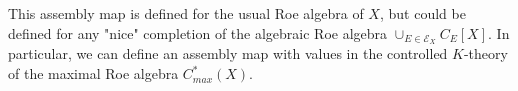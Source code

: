 \begin{rk}
This assembly map is defined for the usual Roe algebra of $X$, but could be defined for any "nice" completion of the algebraic Roe algebra $\cup_{E\in \mathcal E_X} C_E[X]$. In particular, we can define an assembly map with values in the controlled $K$-theory of the maximal Roe algebra $C_{max}
^*(X)$.\end{rk}

 

































